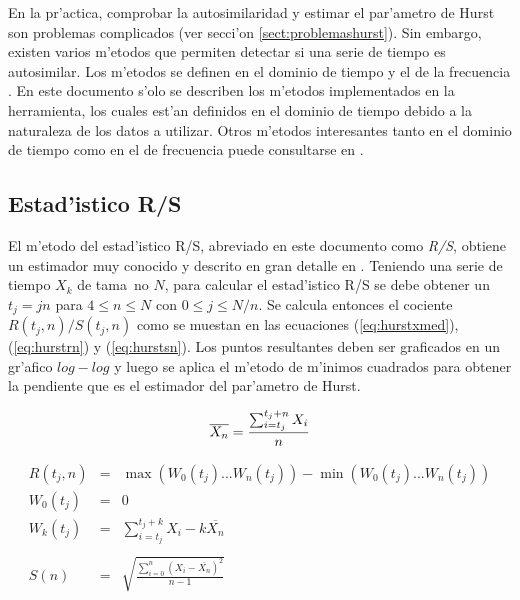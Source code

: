En la pr'actica, comprobar la autosimilaridad y estimar el par'ametro de Hurst
son problemas complicados (ver secci'on \ref{sect:problemashurst}). Sin embargo,
existen varios m'etodos que permiten detectar si una serie de tiempo es
autosimilar. Los m'etodos se definen en el dominio de tiempo
\cite{Leland93onthe} \cite{MAVARStefano} y el de la frecuencia
\cite{MAVARStefano} \cite{556987} \cite{1296068}. En este documento s'olo se
describen los m'etodos implementados en la herramienta, los cuales est'an
definidos en el dominio de tiempo debido a la naturaleza de los datos a
utilizar. Otros m'etodos interesantes tanto en el dominio de tiempo como en el
de frecuencia puede consultarse en \cite{1296068}. 


\subsection{Estad'istico R/S} \label{subsect:rsstat}

El m'etodo del estad'istico R/S, abreviado en este documento como {\it R/S},
obtiene un estimador muy conocido y descrito en gran detalle en
\cite{Leland93onthe}. Teniendo una serie de tiempo $X_k$ de tama~no $N$, para
calcular el estad'istico R/S se debe obtener un $t_j = j n$ para 
$4 \le n \le N$ con $0 \le j \le N/n$. Se calcula entonces el cociente
$R(t_j,n)/S(t_j,n)$ como se muestan en las ecuaciones (\ref{eq:hurstxmed}),
(\ref{eq:hurstrn}) y (\ref{eq:hurstsn}). Los puntos resultantes deben ser
graficados en un gr'afico $log-log$ y luego se aplica el m'etodo de m'inimos
cuadrados para obtener la pendiente que es el estimador del par'ametro de Hurst.

\begin{equation} \label{eq:hurstxmed}
\overline{X_n} = \frac{{\sum_{i = t_j}^{t_j + n}{X_i}}}{n} \\
\end{equation}

\begin{eqnarray} \label{eq:hurstrn}
R(t_j,n) & = & \max (W_0(t_j) ... W_n(t_j)) - \min (W_0(t_j) ... W_n(t_j)) \\
W_0(t_j) & = & 0 \nonumber \\
W_k(t_j) & = & \sum_{i=t_j}^{t_j + k}{X_i - k \overline{X_n}} \nonumber \\
\nonumber \\
\label{eq:hurstsn}
S(n) & = & \sqrt{\frac{\sum_{i=0}^{n}{(X_i - \overline{X_n})^2}}{n-1}}
\end{eqnarray}

